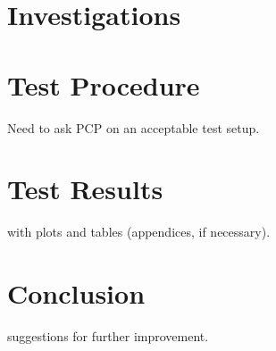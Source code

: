 \documentclass[11pt, a4paper]{article}
\begin{document}
\section{Investigations}


\section{Test Procedure}
Need to ask PCP on an acceptable test setup.

\section{Test Results}
with plots and tables (appendices, if necessary).

\section{Conclusion}
suggestions for further improvement.




\end{document}
